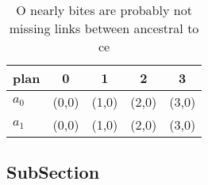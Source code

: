 \documentclass[a4paper]{article}
\begin{document}
\begin{table}
\begin{adjustbox}{width=0.5\columnwidth}
\begin{tabular}{|l|l|l|l|l|}
\hline
\textbf{plan} & \multicolumn{1}{c|}{\textbf{0}} & \multicolumn{1}{c|}{\textbf{1}} & \multicolumn{1}{c|}{\textbf{2}} & \multicolumn{1}{c|}{\textbf{3}} \\ \hline
\textbf{$a_0$}  & (0,0) & (1,0) & (2,0) & (3,0) \\ \hline
\textbf{$a_1$}  & (0,0) & (1,0) & (2,0) & (3,0) \\ \hline
\end{tabular}
\end{adjustbox}
\caption{O nearly bites are probably not missing links between ancestral to ce
}
\end{table}

\subsection{SubSection}
\end{document}
